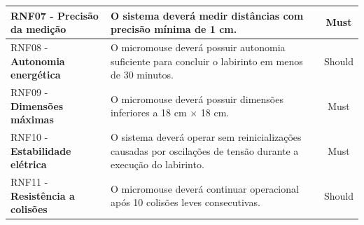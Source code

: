 \begin{center}
{\begin{tabular}{|p{6cm}|p{9cm}|c|}
    RNF07 - \textbf{Precisão da medição} & O sistema deverá medir distâncias com precisão mínima de 1 cm. & Must \\ \hline

    RNF08 - \textbf{Autonomia energética} & O micromouse deverá possuir autonomia suficiente para concluir o labirinto em menos de 30 minutos. & Should \\ \hline

    RNF09 - \textbf{Dimensões máximas} & O micromouse deverá possuir dimensões inferiores a 18 cm × 18 cm. & Must \\ \hline

    RNF10 - \textbf{Estabilidade elétrica} & O sistema deverá operar sem reinicializações causadas por oscilações de tensão durante a execução do labirinto. & Must \\ \hline

    RNF11 - \textbf{Resistência a colisões} & O micromouse deverá continuar operacional após 10 colisões leves consecutivas. & Should \\ \hline

    \end{tabular}
    }

    \label{tab:rnf}
    \end{center}

